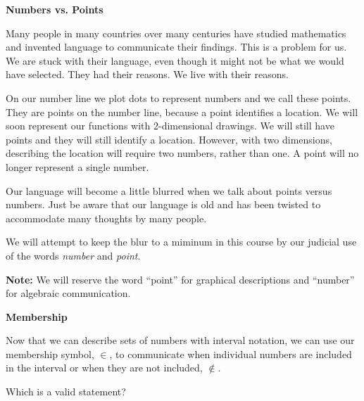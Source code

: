 \documentclass{ximera}
\begin{document}
\begin{warning}  \textbf{\textcolor{red!70!black}{Numbers vs. Points}} 

Many people in many countries over many centuries have studied mathematics and invented language to communicate their findings. This is a problem for us. We are stuck with their language, even though it might not be what we would have selected. They had their reasons.  We live with their reasons.

On our number line we plot dots to represent numbers and we call these points.  They are points on the number line, because a point identifies a location.  We will soon represent our functions with 2-dimensional drawings. We will still have points and they will still identify a location.  However, with two dimensions, describing the location will require two numbers, rather than one.  A point will no longer represent a single number.

Our language will become a little blurred when we talk about points versus numbers.  Just be aware that our language is old and has been twisted to accommodate many thoughts by many people.


We will attempt to keep the blur to a miminum in this course by our judicial use of the words \textit{number} and \textit{point}.

\textbf{Note:} We will reserve the word ``point'' for graphical descriptions and ``number'' for algebraic communication.
\end{warning}








\begin{notation}  \textbf{\textcolor{red!50!green}{Membership}} 

Now that we can describe sets of numbers with interval notation, we can use our membership symbol, $\in$, to communicate when individual numbers are included in the interval or when they are not included, $\notin$.

\end{notation}








\begin{question}

Which is a valid statement?
    \begin{multipleChoice}
    \choice {$ 2 \in [3, -2)$}
    \choice [correct]{$-2 \in [-2, 3)$}
    \end{multipleChoice}
\end{question}
\end{document}
